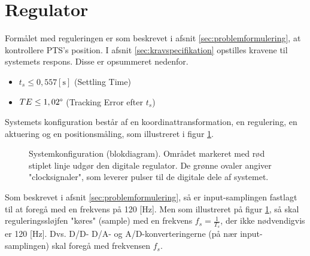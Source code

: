 \section{Regulator}
\label{sec:kontrollerdeign}
% 

Formålet med reguleringen er som beskrevet i afsnit \ref{sec:problemformulering},
at kontrollere PTS's position.
I afsnit \ref{sec:kravspecifikation} opstilles kravene til systemets respons.
Disse er opsummeret nedenfor.
\begin{itemize}
\itemsep1pt
\item \(t_{s} \leq 0,557 \mathrm{\left[s\right]}\) (Settling Time)
\item \(TE \leq 1,02 \degree\) (Tracking Error efter \(t_s\))
\end{itemize}

Systemets konfiguration består af en koordinattransformation,
en regulering, en aktuering og en positionsmåling, som illustreret
i figur \ref{fig:digitalkontroller1}.
\begin{figure}[!th]
\centering
\begin{tikzpicture}[scale=0.8, every node/.style={scale=0.8}, node distance=2.6cm, =>latex']

\end{tikzpicture}
\caption[Systemkonfiguration]{Systemkonfiguration (blokdiagram).
	Området markeret med rød stiplet linje udgør den digitale regulator.
	De grønne ovaler angiver "clocksignaler", som leverer pulser til de digitale dele af systemet.}
\label{fig:digitalkontroller1}
\end{figure}

Som beskrevet i afsnit \ref{sec:problemformulering},
så er input-samplingen fastlagt til at foregå med en frekvens på 120 [Hz].
Men som illustreret på figur \ref{fig:digitalkontroller1}, så skal reguleringssløjfen
"køres" (sample) med en frekvens \(f_s=\frac{1}{T_s}\), der ikke nødvendigvis er 120 [Hz].
Dvs. D/D- D/A- og A/D-konverteringerne (på nær input-samplingen) skal foregå med frekvensen \(f_s\).


